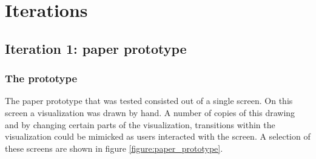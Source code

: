 \section{Iterations}

\subsection{Iteration 1: paper prototype}\label{chapter:prototype:section:paper}


\subsubsection{The prototype}\label{chapter:prototype:section:paper:prototype}

The paper prototype that was tested consisted out of a single screen. On this screen a visualization was drawn by hand. A number of copies of this drawing and by changing certain parts of the visualization, transitions within the visualization could be mimicked as users interacted with the screen. A selection of these screens are shown in figure \ref{figure:paper_prototype}.

